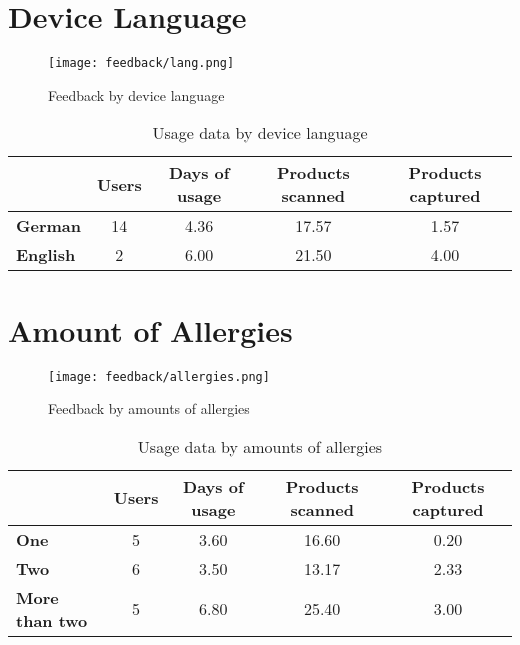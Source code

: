 \section{Device Language}

    \begin{figure}[H]
      \centering
      \texttt{[image: feedback/lang.png]}
      \caption{Feedback by device language}
      \label{fig:feedback-lang}
      \end{figure}
      
    \begin{table}[H]
        \begin{tabular}{l|c|c|c|c|}
        \cline{2-5}
            & Users & Days of usage & Products scanned & Products captured \\ \hline
            \multicolumn{1}{|l|}{\textbf{German}}     & 14          & 4.36          & 17.57            & 1.57              \\ \hline
            \multicolumn{1}{|l|}{\textbf{English}} & 2           & 6.00          & 21.50            & 4.00              \\ \hline
        \end{tabular}
        \caption{Usage data by device language}
        \label{tab:usage-lang}
    \end{table}
    
\section{Amount of Allergies}

    \begin{figure}[H]
      \centering
      \texttt{[image: feedback/allergies.png]}
      \caption{Feedback by amounts of allergies}
      \label{fig:feedback-allergies}
      \end{figure}
      
    \begin{table}[H]
        \begin{tabular}{l|c|c|c|c|}
        \cline{2-5}
            & Users & Days of usage & Products scanned & Products captured \\ \hline
            \multicolumn{1}{|l|}{\textbf{One}}     & 5          & 3.60          & 16.60            & 0.20              \\ \hline
            \multicolumn{1}{|l|}{\textbf{Two}}     & 6          & 3.50          & 13.17            & 2.33              \\ \hline
            \multicolumn{1}{|l|}{\textbf{More than two}} & 5           & 6.80          & 25.40            & 3.00              \\ \hline
        \end{tabular}
        \caption{Usage data by amounts of allergies}
        \label{tab:usage-allergies}
    \end{table}

